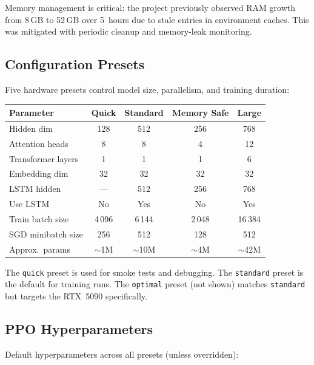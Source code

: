 Memory management is critical: the project previously observed RAM growth from
8\,GB to 52\,GB over 5~hours due to stale entries in environment caches.  This
was mitigated with periodic cleanup and memory-leak monitoring.

\subsection{Configuration Presets}

Five hardware presets control model size, parallelism, and training duration:

\begin{center}
\small
\begin{tabularx}{\textwidth}{l c c c c}
  \toprule
  \textbf{Parameter} & \textbf{Quick} & \textbf{Standard} & \textbf{Memory Safe} & \textbf{Large} \\
  \midrule
  Hidden dim              & 128   & 512   & 256   & 768   \\
  Attention heads         & 8     & 8     & 4     & 12    \\
  Transformer layers      & 1     & 1     & 1     & 6     \\
  Embedding dim           & 32    & 32    & 32    & 32    \\
  LSTM hidden             & ---   & 512   & 256   & 768   \\
  Use LSTM                & No    & Yes   & No    & Yes   \\
  Train batch size        & 4\,096  & 6\,144  & 2\,048  & 16\,384 \\
  SGD minibatch size      & 256   & 512   & 128   & 512   \\
  Approx.\ params         & $\sim$1M & $\sim$10M & $\sim$4M & $\sim$42M \\
  \bottomrule
\end{tabularx}
\end{center}

The \texttt{quick} preset is used for smoke tests and debugging.  The
\texttt{standard} preset is the default for training runs.  The
\texttt{optimal} preset (not shown) matches \texttt{standard} but targets the
RTX~5090 specifically.

\subsection{PPO Hyperparameters}

Default hyperparameters across all presets (unless overridden):

